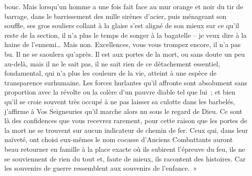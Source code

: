 \documentclass[french,twoside]{book} %
\newcommand{\astertri}{\medskip\par\centerline{\color{rubric}\large\selectfont{\syms ✻\,✻\,✻}}\medskip\par}%
\begin{document}
bouc. Mais lorsqu’un homme a une fois fait face au mur orange et noir du tir de barrage, dans le barrissement des mille sirènes d’acier, puis ménageant son souffle, ses gros souliers collant à la glaise s’est aligné de son mieux sur ce qu’il reste de la section, il n’a plus le temps de songer à la bagatelle – je veux dire à la haine de l’ennemi… Mais non. Excellences, vous vous trompez encore, il n’a pas bu. Il ne se saoulera qu’après. Il est aux portes de la mort, ou sans doute un peu au-delà, mais il ne le sait pas, il ne sait rien de ce détachement essentiel, fondamental, qui n’a plus les couleurs de la vie, atteint à une espèce de transparence surhumaine. Les forces hurlantes qu’il affronte sont absolument sans proportion avec la révolte ou la colère d’un pauvre diable tel que lui ; et bien qu’il se croie souvent très occupé à ne pas laisser sa culotte dans les barbelés, j’affirme à Vos Seigneuries qu’il marche alors nu sous le regard de Dieu. Ce sont là des confidences que vous recevrez rarement, pour cette raison que les portes de la mort ne se trouvent sur aucun indicateur de chemin de fer. Ceux qui, dans leur naïveté, ont choisi eux-mêmes le nom cocasse d’Anciens Combattants auront beau retourner en famille à la place exacte où ils subirent l’épreuve du feu, ils ne se souviennent de rien du tout et, faute de mieux, ils racontent des histoires. Car les souvenirs de guerre ressemblent aux souvenirs de l’enfance. »\par
 \par

\astertri
\end{document}
